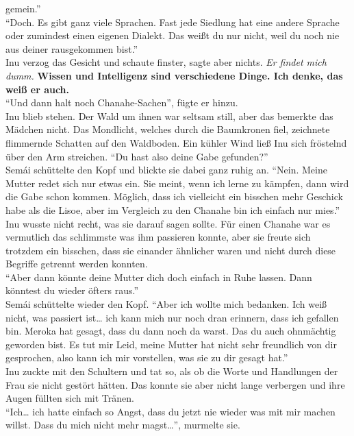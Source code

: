 \documentclass[a4paper,12pt]{book}
\begin{document}
gemein.''\\
``Doch. Es gibt ganz viele Sprachen. Fast jede Siedlung hat eine andere Sprache oder zumindest 
einen eigenen Dialekt. Das weißt du nur nicht, weil du noch nie aus deiner rausgekommen bist.''\\
Inu verzog das Gesicht und schaute finster, sagte aber nichts. \textit{Er findet mich dumm.}
\textbf{Wissen und Intelligenz sind verschiedene Dinge. Ich denke, das weiß er auch.}\\
``Und dann halt noch Chanahe-Sachen'', fügte er hinzu.\\
Inu blieb stehen. Der Wald um ihnen war seltsam still, aber das bemerkte das Mädchen nicht. Das 
Mondlicht, welches durch die Baumkronen fiel, zeichnete flimmernde Schatten auf den Waldboden. Ein 
kühler Wind ließ Inu sich fröstelnd über den Arm streichen. ``Du hast also deine Gabe gefunden?''\\
Semái schüttelte den Kopf und blickte sie dabei ganz ruhig an. ``Nein. Meine Mutter redet sich nur 
etwas ein. Sie meint, wenn ich lerne zu kämpfen, dann wird die Gabe schon kommen. Möglich, dass ich 
vielleicht ein bisschen mehr Geschick habe als die Lisoe, aber im Vergleich zu den Chanahe bin ich 
einfach nur mies.''\\
Inu wusste nicht recht, was sie darauf sagen sollte. Für einen Chanahe war es vermutlich das 
schlimmste was ihm passieren konnte, aber sie freute sich trotzdem ein bisschen, dass sie einander 
ähnlicher waren und nicht durch diese Begriffe getrennt werden konnten. \\
``Aber dann könnte deine Mutter dich doch einfach in Ruhe lassen. Dann könntest du wieder öfters 
raus.''\\
Semái schüttelte wieder den Kopf. ``Aber ich wollte mich bedanken. Ich weiß nicht, was passiert 
ist… ich kann mich nur noch dran erinnern, dass ich gefallen bin. Meroka hat gesagt, dass du dann 
noch da warst. Das du auch ohnmächtig geworden bist. Es tut mir Leid, meine Mutter hat nicht sehr 
freundlich von dir gesprochen, also kann ich mir vorstellen, was sie zu dir gesagt hat.''\\
Inu zuckte mit den Schultern und tat so, als ob die Worte und Handlungen der Frau sie nicht gestört 
hätten. Das konnte sie aber nicht lange verbergen und ihre Augen füllten sich mit Tränen. \\
``Ich… ich hatte einfach so Angst, dass du jetzt nie wieder was mit mir machen willst. Dass du mich 
nicht mehr magst…'', murmelte sie. \\
\end{document}
